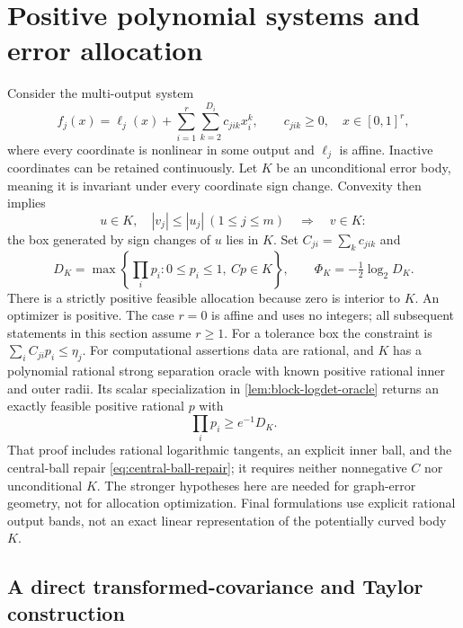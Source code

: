 \section{Positive polynomial systems and error allocation}
\label{sec:positive-allocation}

Consider the multi-output system
\begin{equation}\label{eq:positive-polynomial-system}
 f_j(x)=\ell_j(x)+\sum_{i=1}^r\sum_{k=2}^{D_i}c_{jik}x_i^k,
 \qquad c_{jik}\ge0,\quad x\in[0,1]^r,
\end{equation}
where every coordinate is nonlinear in some output and $\ell_j$ is
affine. Inactive coordinates can be retained continuously. Let $K$ be
an unconditional error body, meaning it is invariant under every
coordinate sign change. Convexity then implies
\begin{equation}\label{eq:positive-unconditional-domination}
 u\in K,\quad |v_j|\le|u_j|\ (1\le j\le m)
 \quad\Longrightarrow\quad v\in K:
\end{equation}
the box generated by sign changes of $u$ lies in $K$.
Set $C_{ji}=\sum_kc_{jik}$ and
\begin{equation}\label{eq:positive-allocation}
 D_K=\max\left\{\prod_ip_i:0\le p_i\le1,\ Cp\in K\right\},
 \qquad \Phi_K=-\tfrac12\log_2D_K.
\end{equation}
There is a strictly positive feasible allocation because zero is interior
to $K$. An optimizer is positive. The case $r=0$ is affine and uses no
integers; all subsequent statements in this section assume $r\ge1$.
For a tolerance box the constraint is $\sum_iC_{ji}p_i\le\eta_j$.
For computational assertions data are rational, and $K$ has a polynomial
rational strong separation oracle with known positive rational inner
and outer radii. Its scalar specialization in
\cref{lem:block-logdet-oracle} returns an exactly feasible positive
rational $p$ with
\begin{equation}\label{eq:positive-allocation-oracle}
 \prod_ip_i\ge e^{-1}D_K.
\end{equation}
That proof includes rational logarithmic tangents, an explicit inner
ball, and the central-ball repair \eqref{eq:central-ball-repair}; it
requires neither nonnegative $C$ nor unconditional $K$. The stronger
hypotheses here are needed for graph-error geometry, not for allocation
optimization. Final formulations use explicit rational output bands,
not an exact linear representation of the potentially curved body $K$.

\subsection{A direct transformed-covariance and Taylor construction}

